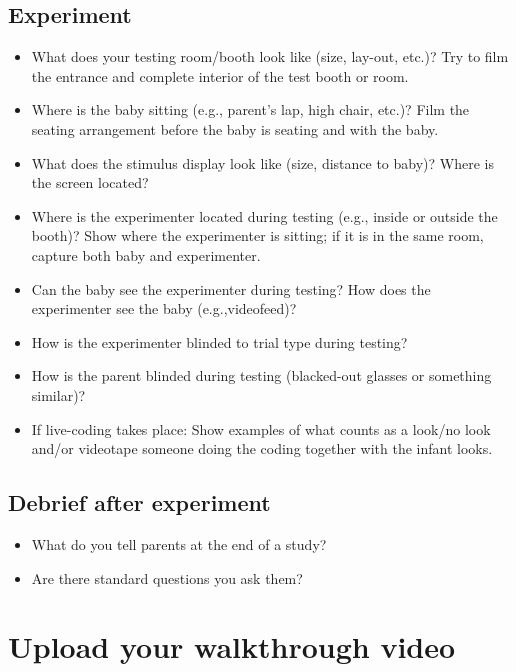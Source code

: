 \documentclass[
  letterpaper,
  DIV=11,
  numbers=noendperiod,
  oneside]{scrreprt}
\providecommand{\tightlist}{%
  \setlength{\itemsep}{0pt}\setlength{\parskip}{0pt}}
\begin{document}
\subsection{Experiment}\label{experiment}

\begin{itemize}
\tightlist
\item
  What does your testing room/booth look like (size, lay-out, etc.)? Try
  to film the entrance and complete interior of the test booth or room.
\item
  Where is the baby sitting (e.g., parent's lap, high chair, etc.)? Film
  the seating arrangement before the baby is seating and with the baby.
\item
  What does the stimulus display look like (size, distance to baby)?
  Where is the screen located?
\item
  Where is the experimenter located during testing (e.g., inside or
  outside the booth)? Show where the experimenter is sitting; if it is
  in the same room, capture both baby and experimenter.
\item
  Can the baby see the experimenter during testing? How does the
  experimenter see the baby (e.g.,videofeed)?
\item
  How is the experimenter blinded to trial type during testing?
\item
  How is the parent blinded during testing (blacked-out glasses or
  something similar)?
\item
  If live-coding takes place: Show examples of what counts as a look/no
  look and/or videotape someone doing the coding together with the
  infant looks.
\end{itemize}

\subsection{Debrief after experiment}\label{debrief-after-experiment}

\begin{itemize}
\tightlist
\item
  What do you tell parents at the end of a study?
\item
  Are there standard questions you ask them?
\end{itemize}

\section{Upload your walkthrough
video}\label{upload-your-walkthrough-video}
\end{document}
